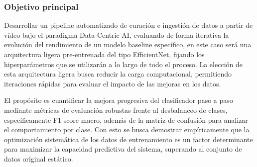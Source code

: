 ﻿\documentclass[10pt,a4paper,twocolumn,twoside]{article}
\begin{document}
\subsubsection{Objetivo principal}
Desarrollar un pipeline automatizado de curación e ingestión de datos a partir de vídeo bajo el paradigma Data-Centric AI, evaluando de forma iterativa la evolución del rendimiento de un modelo baseline específico, en este caso será una arquitectura ligera pre-entrenada del tipo EfficientNet\cite{tan2019efficientnet}, fijando los hiperparámetros que se utilizarán a lo largo de todo el proceso. La elección de esta arquitectura ligera busca reducir la carga computacional, permitiendo iteraciones rápidas para evaluar el impacto de las mejoras en los datos.

El propósito es cuantificar la mejora progresiva del clasificador paso a paso mediante métricas de evaluación robustas frente al desbalanceo de clases, específicamente F1-score macro, además de la matriz de confusión para analizar el comportamiento por clase. Con esto se busca demostrar empíricamente que la optimización sistemática de los datos de entrenamiento es un factor determinante para maximizar la capacidad predictiva del sistema, superando al conjunto de datos original estático.
\end{document}
